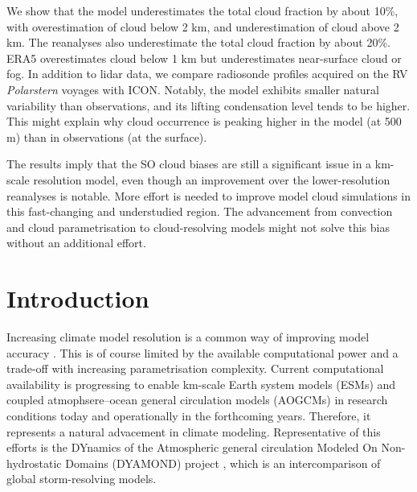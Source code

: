 \documentclass[12pt,a4paper]{article}
\begin{document}
We show that the model underestimates the total cloud fraction by about 10\%, with overestimation of cloud below 2 km, and underestimation of cloud above 2 km. The reanalyses also underestimate the total cloud fraction by about 20\%. ERA5 overestimates cloud below 1 km but underestimates near-surface cloud or fog. In addition to lidar data, we compare radiosonde profiles acquired on the RV \textit{Polarstern} voyages with ICON. Notably, the model exhibits smaller natural variability than observations, and its lifting condensation level tends to be higher. This might explain why cloud occurrence is peaking higher in the model (at 500 m) than in observations (at the surface).

The results imply that the SO cloud biases are still a significant issue in a km-scale resolution model, even though an improvement over the lower-resolution reanalyses is notable. More effort is needed to improve model cloud simulations in this fast-changing and understudied region. The advancement from convection and cloud parametrisation to cloud-resolving models might not solve this bias without an additional effort.

\section{Introduction}

Increasing climate model resolution is a common way of improving model
accuracy \citep{mauritsen2022}. This is of course limited by the available
computational power and a trade-off with increasing parametrisation complexity.
Current computational availability is progressing to enable km-scale Earth
system models (ESMs) and coupled atmophsere--ocean general circulation models
(AOGCMs) in research conditions today and operationally in the forthcoming
years. Therefore, it represents a natural advacement in climate modeling.
Representative of this efforts is the DYnamics of the Atmospheric general
circulation Modeled On Non-hydrostatic Domains (DYAMOND) project
\citep{stevens2019}, which is an intercomparison of global storm-resolving
models.
\end{document}
